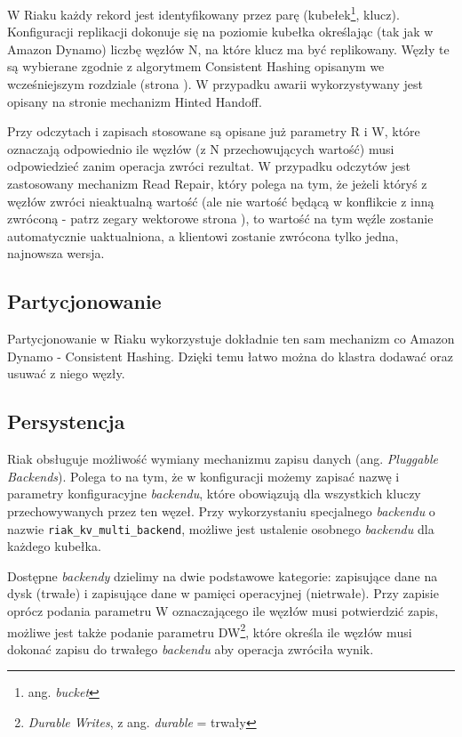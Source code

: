 W Riaku każdy rekord jest identyfikowany przez parę (kubełek\footnote{ang. \emph{bucket}}, klucz).
Konfiguracji replikacji dokonuje się na poziomie kubełka określając (tak jak w Amazon Dynamo) liczbę węzłów N, na które klucz ma być replikowany.
Węzły te są wybierane zgodnie z algorytmem Consistent Hashing opisanym we wcześniejszym rozdziale (strona \pageref{sec:dynamo-consistent-hashing}).
W przypadku awarii wykorzystywany jest opisany na stronie \pageref{sec:dynamo-hinted-handoff} mechanizm Hinted Handoff.

Przy odczytach i zapisach stosowane są opisane już parametry R i W, które oznaczają odpowiednio ile węzłów (z N przechowujących wartość) musi odpowiedzieć zanim operacja zwróci rezultat.
W przypadku odczytów jest zastosowany mechanizm Read Repair, który polega na tym, że jeżeli któryś z węzłów zwróci nieaktualną wartość (ale nie wartość będącą w konflikcie z inną zwróconą - patrz zegary wektorowe strona \pageref{sec:dynamo-vector-clocks}), to wartość na tym węźle zostanie automatycznie uaktualniona, a klientowi zostanie zwrócona tylko jedna, najnowsza wersja. 

\subsection*{Partycjonowanie}

Partycjonowanie w Riaku wykorzystuje dokładnie ten sam mechanizm co Amazon Dynamo - Consistent Hashing.
Dzięki temu łatwo można do klastra dodawać oraz usuwać z niego węzły.

\subsection*{Persystencja}

Riak obsługuje możliwość wymiany mechanizmu zapisu danych (ang. \emph{Pluggable Backends}).
Polega to na tym, że w konfiguracji możemy zapisać nazwę i parametry konfiguracyjne \emph{backendu}, które obowiązują dla wszystkich kluczy przechowywanych przez ten węzeł.
Przy wykorzystaniu specjalnego \emph{backendu} o nazwie \verb+riak_kv_multi_backend+, możliwe jest ustalenie osobnego \emph{backendu} dla każdego kubełka.

Dostępne \emph{backendy} dzielimy na dwie podstawowe kategorie: zapisujące dane na dysk (trwałe) i zapisujące dane w pamięci operacyjnej (nietrwałe).
Przy zapisie oprócz podania parametru W oznaczającego ile węzłów musi potwierdzić zapis, możliwe jest także podanie parametru DW\footnote{\emph{Durable Writes}, z ang. \emph{durable} = trwały}, które określa ile węzłów musi dokonać zapisu do trwałego \emph{backendu} aby operacja zwróciła wynik.

